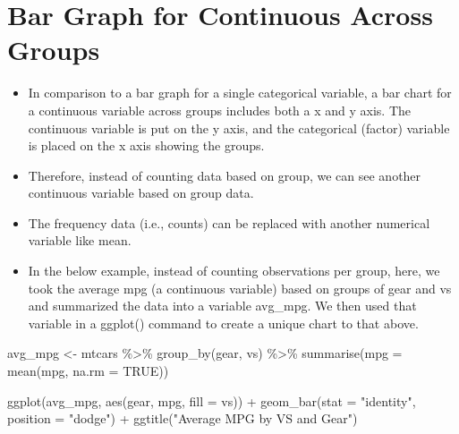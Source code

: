 \documentclass[
  letterpaper,
  DIV=11,
  numbers=noendperiod]{scrreprt}
\newenvironment{Shaded}{\begin{snugshade}}{\end{snugshade}}
\newcommand{\AttributeTok}[1]{\textcolor[rgb]{0.40,0.45,0.13}{#1}}
\newcommand{\ConstantTok}[1]{\textcolor[rgb]{0.56,0.35,0.01}{#1}}
\newcommand{\FunctionTok}[1]{\textcolor[rgb]{0.28,0.35,0.67}{#1}}
\newcommand{\NormalTok}[1]{\textcolor[rgb]{0.00,0.23,0.31}{#1}}
\newcommand{\OtherTok}[1]{\textcolor[rgb]{0.00,0.23,0.31}{#1}}
\newcommand{\SpecialCharTok}[1]{\textcolor[rgb]{0.37,0.37,0.37}{#1}}
\newcommand{\StringTok}[1]{\textcolor[rgb]{0.13,0.47,0.30}{#1}}
\begin{document}
\section{Bar Graph for Continuous Across
Groups}\label{bar-graph-for-continuous-across-groups}

\begin{itemize}
\item
  In comparison to a bar graph for a single categorical variable, a bar
  chart for a continuous variable across groups includes both a x and y
  axis. The continuous variable is put on the y axis, and the
  categorical (factor) variable is placed on the x axis showing the
  groups.
\item
  Therefore, instead of counting data based on group, we can see another
  continuous variable based on group data.
\item
  The frequency data (i.e., counts) can be replaced with another
  numerical variable like mean.
\item
  In the below example, instead of counting observations per group,
  here, we took the average mpg (a continuous variable) based on groups
  of gear and vs and summarized the data into a variable avg\_mpg. We
  then used that variable in a ggplot() command to create a unique chart
  to that above.
\end{itemize}

\begin{Shaded}
\begin{Highlighting}[]
\NormalTok{avg\_mpg }\OtherTok{\textless{}{-}}\NormalTok{ mtcars }\SpecialCharTok{\%\textgreater{}\%}
    \FunctionTok{group\_by}\NormalTok{(gear, vs) }\SpecialCharTok{\%\textgreater{}\%}
    \FunctionTok{summarise}\NormalTok{(}\AttributeTok{mpg =} \FunctionTok{mean}\NormalTok{(mpg, }\AttributeTok{na.rm =} \ConstantTok{TRUE}\NormalTok{))}
\end{Highlighting}
\end{Shaded}

\begin{Shaded}
\begin{Highlighting}[]
\FunctionTok{ggplot}\NormalTok{(avg\_mpg, }\FunctionTok{aes}\NormalTok{(gear,}
\NormalTok{  mpg, }\AttributeTok{fill =}\NormalTok{ vs)) }\SpecialCharTok{+}
  \FunctionTok{geom\_bar}\NormalTok{(}\AttributeTok{stat =} \StringTok{"identity"}\NormalTok{, }\AttributeTok{position =} \StringTok{"dodge"}\NormalTok{) }\SpecialCharTok{+}
  \FunctionTok{ggtitle}\NormalTok{(}\StringTok{"Average MPG by VS and Gear"}\NormalTok{)}
\end{Highlighting}
\end{Shaded}
\end{document}
